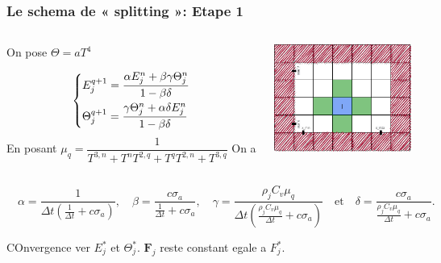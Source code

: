 \documentclass[xcolor=dvipsnames]{beamer} %
\newcommand{\bvec}[1]{\mathbf{#1}}
\begin{document}
\begin{frame}
  \frametitle{Le schema de « splitting »: Etape 1}
  \begin{columns}
    \begin{column}{0.5\textwidth}
      On pose $\Theta = aT^4$

      \begingroup
      \normalsize
      \begin{equation*} 
        \begin{dcases}
         E_j^{q+1} = \dfrac{\alpha E_j^n + \beta \gamma \Theta_j^n}{1 - \beta \delta} \\
         \Theta_j^{q+1} = \dfrac{\gamma \Theta_j^n + \alpha \delta E_j^n}{1 - \beta \delta} 
        \end{dcases}
    \label{eqn:Step1}
    \end{equation*}
      \endgroup
      En posant
      \scriptsize
      $\mu_q = \dfrac{1}{T^{3,n} + T^{n}T^{2,q} + T^{q}T^{2,n} + T^{3,q}}$
      \normalsize
      On a
    \end{column}
    \begin{column}{0.5\textwidth}
       \begin{center}
        \includegraphics[width=4.5cm]{Dicretisation2D}       
       \end{center}
    \end{column}
   \end{columns}
   \tiny
  $\quad  \alpha = \dfrac{1}{\Delta t \left( \frac{1}{\Delta t} + c \sigma_a \right)} ,\quad 
   \beta = \dfrac{c \sigma_a}{\frac{1}{\Delta t} + c \sigma_a} ,\quad 
   \gamma = \dfrac{\rho_j C_v \mu_q}{\Delta t \left( \frac{\rho_j C_v \mu_q}{\Delta t} + c \sigma_a \right)} \quad \text{et} \quad  
   \delta = \dfrac{c \sigma_a}{\frac{\rho_j C_v \mu_q}{\Delta t} + c \sigma_a}.$

   \normalsize
   COnvergence ver $E_j^*$ et $\Theta_j^*$. $\bvec F_j$ reste constant egale a $F_j^*$.
   
\end{frame}
\end{document}
